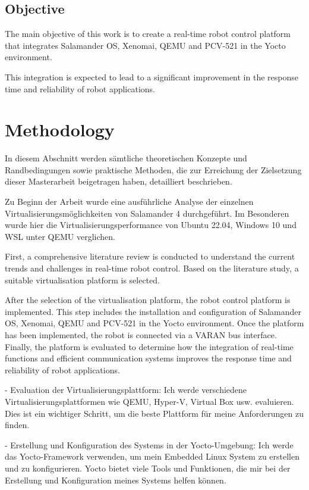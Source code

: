 \documentclass[MMR,Master,english]{twbook}
\begin{document}
\clearpage
\section{Objective}

The main objective of this work is to create a real-time robot control platform that integrates Salamander OS, Xenomai, QEMU and PCV-521 in the Yocto environment. 

This integration is expected to lead to a significant improvement in the response time and reliability of robot applications.


\clearpage
\chapter{Methodology}
 
In diesem Abschnitt werden sämtliche theoretischen Konzepte und Randbedingungen sowie praktische Methoden, die zur Erreichung der Zielsetzung dieser Masterarbeit beigetragen haben, detailliert beschrieben.

Zu Beginn der Arbeit wurde eine ausführliche Analyse der einzelnen Virtualisierungsmöglichkeiten von Salamander 4 durchgeführt. Im Besonderen wurde hier die Virtualisierungsperformance von Ubuntu 22.04, Windows 10 und WSL unter QEMU verglichen.


First, a comprehensive literature review is conducted to understand the current trends and challenges in real-time robot control. Based on the literature study, a suitable virtualisation platform is selected. 


After the selection of the virtualisation platform, the robot control platform is implemented. This step includes the installation and configuration of Salamander OS, Xenomai, QEMU and PCV-521 in the Yocto environment. Once the platform has been implemented, the robot is connected via a VARAN bus interface. Finally, the platform is evaluated to determine how the integration of real-time functions and efficient communication systems improves the response time and reliability of robot applications.

- Evaluation der Virtualisierungsplattform: 
Ich werde verschiedene Virtualisierungsplattformen wie QEMU, Hyper-V, Virtual Box usw. evaluieren. Dies ist ein wichtiger Schritt, um die beste Plattform für meine Anforderungen zu finden.
  
- Erstellung und Konfiguration des Systems in der Yocto-Umgebung: 
Ich werde das Yocto-Framework verwenden, um mein Embedded Linux System zu erstellen und zu konfigurieren. Yocto bietet viele Tools und Funktionen, die mir bei der Erstellung und Konfiguration meines Systems helfen können.
\end{document}
